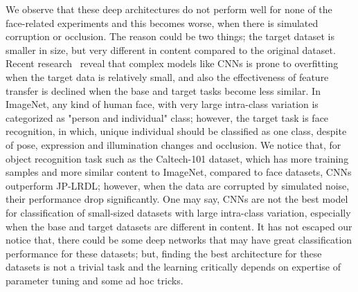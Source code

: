 \documentclass[journal]{IEEEtran}
\begin{document}
We observe that these deep architectures do not perform well for none of the face-related experiments and this becomes worse, when there is simulated corruption or occlusion. The reason could be two things; the target dataset is smaller in size, but very different in content compared to the original dataset. Recent research~\cite{Transferable} reveal that complex models like CNNs is prone to overfitting when the target data is relatively small, and also the effectiveness of feature transfer is declined when the base and target tasks become less similar. In ImageNet, any kind of human face, with very large intra-class variation is categorized as "person and individual" class; however, the target task is face recognition, in which, unique individual should be classified as one class, despite of pose, expression and illumination changes and occlusion. We notice that, for object recognition task such as the Caltech-101 dataset, which has more training samples and more similar content to ImageNet, compared to face datasets, CNNs outperform JP-LRDL; however, when the data are corrupted by simulated noise, their performance drop significantly. One may say, CNNs are not the best model for classification of small-sized datasets with large intra-class variation, especially when the base and target datasets are different in content. It has not escaped our notice that, there could be some deep networks that may have great classification performance for these datasets; but, finding the best architecture for these datasets is not a trivial task and the learning critically depends on expertise of parameter tuning and some ad hoc tricks.
\end{document}
